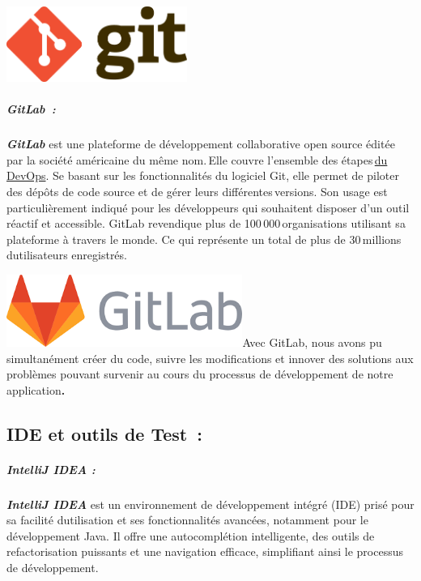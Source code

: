\documentclass[12pt,a4paper,twoside]{report}
\begin{document}
\includegraphics[width=2.32361in,height=0.97014in]{latex_media/media/image29.png}

\hypertarget{gitlab}{%
\subparagraph{GitLab~:}\label{gitlab}}

\emph{\textbf{GitLab}} est une plateforme de développement collaborative
open source éditée par la société américaine du même nom.\,Elle couvre
l'ensemble des
étapes\,\href{https://www.journaldunet.fr/web-tech/guide-de-l-entreprise-digitale/1443818-devops-tout-savoir-sur-la-demarche-des-outils-au-metier/}{du
DevOps}. Se basant sur les fonctionnalités du logiciel Git, elle permet
de piloter des dépôts de code source et de gérer leurs
différentes\,versions. Son usage est particulièrement indiqué pour les
développeurs qui souhaitent disposer d'un outil réactif et accessible.
GitLab revendique plus de 100\,000\,organisations utilisant sa
plateforme à travers le monde. Ce qui représente un total de plus de
30\,millions d\textquotesingle utilisateurs enregistrés.~~

\includegraphics[width=3.03542in,height=0.92639in]{latex_media/media/image30.png}Avec
GitLab, nous avons pu simultanément créer du code, suivre les
modifications et innover des solutions aux problèmes pouvant survenir au
cours du processus de développement de notre application\textbf{.}~

\hypertarget{ide-et-outils-de-test}{%
\subsection{IDE et outils de Test~:}\label{ide-et-outils-de-test}}

\hypertarget{intellij-idea}{%
\subparagraph{IntelliJ IDEA :}\label{intellij-idea}}

\emph{\textbf{IntelliJ IDEA}} est un environnement de développement
intégré (IDE) prisé pour sa facilité d\textquotesingle utilisation et
ses fonctionnalités avancées, notamment pour le développement Java. Il
offre une autocomplétion intelligente, des outils de refactorisation
puissants et une navigation efficace, simplifiant ainsi le processus de
développement.
\end{document}
